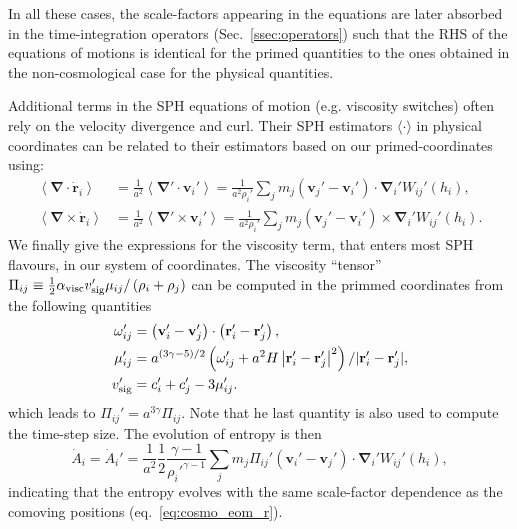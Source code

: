 In all these cases, the scale-factors appearing in the equations are
later absorbed in the time-integration operators
(Sec.~\ref{ssec:operators}) such that the RHS of the equations of
motions is identical for the primed quantities to the ones obtained in
the non-cosmological case for the physical quantities.

Additional terms in the SPH equations of motion (e.g. viscosity
switches) often rely on the velocity divergence and curl. Their SPH
estimators $\langle\cdot\rangle$ in physical coordinates can be
related to their estimators based on our primed-coordinates using:
\begin{align}
  \left\langle \mathbf{\nabla}\cdot\dot{\mathbf{r}}_i \right\rangle &=
  \frac{1}{a^2} \left\langle
  \mathbf{\nabla}'\cdot\mathbf{v}_i'\right\rangle =
  \frac{1}{a^2\rho_i'}\sum_j m_j\left(\mathbf{v}_j' -
  \mathbf{v}_i'\right) \cdot \mathbf{\nabla}_i'W_{ij}'(h_i), \nonumber \\
  \left\langle \mathbf{\nabla}\times\dot{\mathbf{r}}_i \right\rangle &=
  \frac{1}{a^2} \left\langle
  \mathbf{\nabla}'\times\mathbf{v}_i'\right\rangle =
  \frac{1}{a^2\rho_i'}\sum_j m_j\left(\mathbf{v}_j' -
  \mathbf{v}_i'\right) \times \mathbf{\nabla}_i'W_{ij}'(h_i). \nonumber
\end{align}
We finally give the expressions for the \cite{Monaghan1997} viscosity
term, that enters most SPH flavours, in our system of coordinates. The
viscosity ``tensor'' $\Pi_{ij} \equiv \frac{1}{2}\alpha_{\rm visc} v_{\rm
    sig}'\mu_{ij}/\left(\rho_i + \rho_j\right)$ can be computed
  in the primmed coordinates from the following quantities
\begin{align}
  \omega_{ij}' &= \left(\mathbf{v}_i' - \mathbf{v}_j'\right) \cdot
  \left(\mathbf{r}_i' - \mathbf{r}_j'\right), \\
  \mu_{ij}' &=
  a^{(3\gamma-5)/2} \left(\omega_{ij}' + a^2H\left|\mathbf{r}_i' -
  \mathbf{r}_j'\right|^2 \right) / |\mathbf{r}_i' - \mathbf{r}_j' |,
  \\
  v_{\rm sig}' &= c_i' + c_j' - 3 \mu_{ij}'.
\end{align}
which leads to $\Pi_{ij}'=a^{3\gamma}\Pi_{ij}$. Note that he last quantity is
also used to compute the time-step size. The evolution of entropy is
then
\begin{equation}
  \dot{A}_i = \dot{A}_i' = \frac{1}{a^2}\frac{1}{2}\frac{\gamma-1}{\rho_i'^{\gamma-1}} \sum_j
  m_j \Pi_{ij}' \left(\mathbf{v}_i' -
  \mathbf{v}_j'\right)\cdot\mathbf{\nabla}_i'W_{ij}'(h_i),
\end{equation}
indicating that the entropy evolves with the same scale-factor
dependence as the comoving positions (eq.~\ref{eq:cosmo_eom_r}).

